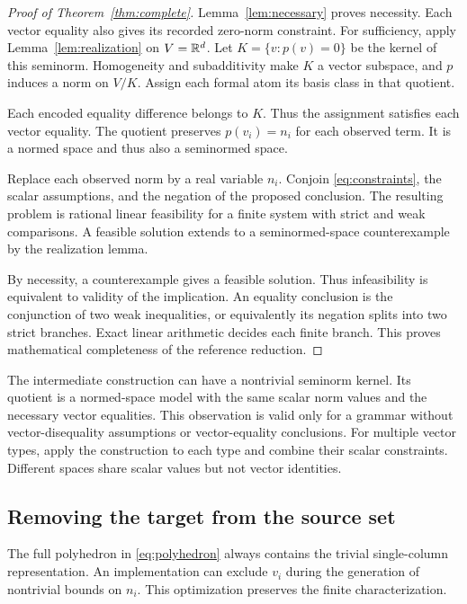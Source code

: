 \begin{proof}[Proof of Theorem~\ref{thm:complete}]
Lemma~\ref{lem:necessary} proves necessity.
Each vector equality also gives its recorded zero-norm constraint.
For sufficiency, apply Lemma~\ref{lem:realization} on $V=\mathbb{R}^d$.
Let $K=\{v:p(v)=0\}$ be the kernel of this seminorm.
Homogeneity and subadditivity make $K$ a vector subspace, and $p$ induces a norm on $V/K$.
Assign each formal atom its basis class in that quotient.

Each encoded equality difference belongs to $K$.
Thus the assignment satisfies each vector equality.
The quotient preserves $p(v_i)=n_i$ for each observed term.
It is a normed space and thus also a seminormed space.

Replace each observed norm by a real variable $n_i$.
Conjoin \eqref{eq:constraints}, the scalar assumptions, and the negation of the proposed conclusion.
The resulting problem is rational linear feasibility for a finite system with strict and weak comparisons.
A feasible solution extends to a seminormed-space counterexample by the realization lemma.

By necessity, a counterexample gives a feasible solution.
Thus infeasibility is equivalent to validity of the implication.
An equality conclusion is the conjunction of two weak inequalities, or equivalently its negation splits into two strict branches.
Exact linear arithmetic decides each finite branch.
This proves mathematical completeness of the reference reduction.
\end{proof}

The intermediate construction can have a nontrivial seminorm kernel.
Its quotient is a normed-space model with the same scalar norm values and the necessary vector equalities.
This observation is valid only for a grammar without vector-disequality assumptions or vector-equality conclusions.
For multiple vector types, apply the construction to each type and combine their scalar constraints.
Different spaces share scalar values but not vector identities.

\subsection{Removing the target from the source set}
The full polyhedron in \eqref{eq:polyhedron} always contains the trivial single-column representation.
An implementation can exclude $v_i$ during the generation of nontrivial bounds on $n_i$.
This optimization preserves the finite characterization.

